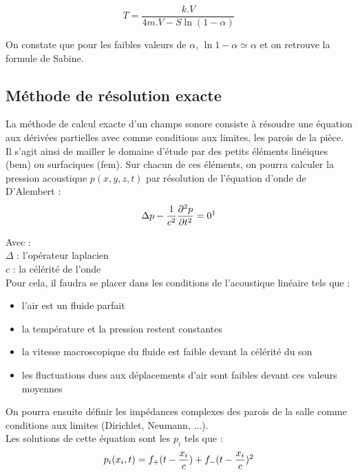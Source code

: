 \begin{equation}
   	T = \frac{k.V}{4m.V - S\ln{(1-\alpha)}}
\end{equation}

On constate que pour les faibles valeurs de $\alpha$, $\ln{1-\alpha} \simeq \alpha$ et on retrouve la formule de Sabine.
 
	\subsection{Méthode de résolution exacte} \label{sect_resExacte}

La méthode de calcul exacte d'un champs sonore consiste à résoudre une équation aux dérivées partielles avec comme conditions aux limites, les parois de la pièce. Il s'agit ainsi de mailler le domaine d'étude par des petits éléments linéiques (\gls{bem}) ou surfaciques (\gls{fem}). Sur chacun de ces éléments, on pourra calculer la pression acoustique $p(x,y,z,t)$ par résolution de l'équation d'onde de D'Alembert :
\begin{equation} 
\Delta p-\frac{1}{c^2}\frac{\partial^2p}{\partial t^2} = 0
\footnotemark
\label{alembert}
\end{equation}

Avec : \\
$\Delta$ : l'opérateur laplacien\\
$c$ : la célérité de l'onde\\

Pour cela, il faudra se placer dans les conditions de l'acoustique linéaire tels que \cite[p. 19]{jot}:

\begin{itemize}
\item l'air est un fluide parfait
\item la température et la pression restent constantes
\item la vitesse macroscopique du fluide est faible devant la célérité du son
\item les fluctuations dues aux déplacements d'air sont faibles devant ces valeurs moyennes
\end{itemize}



On pourra ensuite définir les impédances complexes des parois de la salle comme conditions aux limites (\gls{Dirichlet}, \gls{Neumann}, ...). \\

Les solutions de cette équation sont les $p_i$ tels que :
\begin{equation}
p_i(x_i,t) = f_+(t-\frac{x_i}{c}) + f_-(t-\frac{x_i}{c})
\footnotemark
\end{equation}

